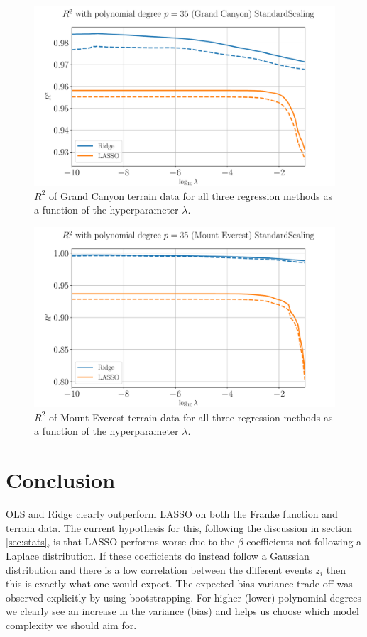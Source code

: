 \documentclass[%
reprint,
amsmath,amssymb,
aps,
pra,
]{revtex4-2}
\begin{document}
\begin{figure}[ht!]
	\centering
	\includegraphics[width=\linewidth]{Python/Figures/Terrain/logR2_GrandCanStandardScaling_35_zoomed.pdf}
	\caption{$R^2$ of Grand Canyon terrain data for all three regression methods as a function of the hyperparameter $\lambda$.}
	\label{fig:log_GrandCan_StandardScaling_35}
\end{figure}

\begin{figure}[ht!]
	\centering
	\includegraphics[width=\linewidth]{Python/Figures/Terrain/logR2_MountEver_standardscaling_35_zoomed.pdf}
	\caption{$R^2$ of Mount Everest terrain data for all three regression methods as a function of the hyperparameter $\lambda$.}
	\label{fig:log_MountEve_StandardScaling_35}
\end{figure}

\section{Conclusion}
OLS and Ridge clearly outperform LASSO on both the Franke function and terrain data. The current hypothesis for this, following the discussion in section \ref{sec:stats}, is that LASSO performs worse due to the $\beta$ coefficients not following a Laplace distribution. If these coefficients do instead follow a Gaussian distribution and there is a low correlation between the different events $z_i$ then this is exactly what one would expect. The expected bias-variance trade-off was observed explicitly by using bootstrapping. For higher (lower) polynomial degrees we clearly see an increase in the variance (bias) and helps us choose which model complexity we should aim for. 
\end{document}
